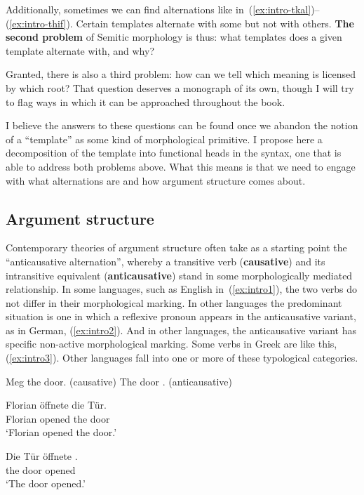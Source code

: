 \begin{exe}
\begin{xlist}
\begin{exe}
\begin{exe}
\begin{exe}
\begin{exe}
\begin{xlist}
Additionally, sometimes we can find alternations like in~(\ref{ex:intro-tkal})--(\ref{ex:intro-thif}). Certain templates alternate with some but not with others. \textbf{The second problem} of Semitic morphology is thus: what templates does a given template alternate with, and why?

Granted, there is also a third problem: how can we tell which meaning is licensed by which root? That question deserves a monograph of its own, though I will try to flag ways in which it can be approached throughout the book.

I believe the answers to these questions can be found once we abandon the notion of a ``template'' as some kind of morphological primitive. I propose here a decomposition of the template into functional heads in the syntax, one that is able to address both problems above. What this means is that we need to engage with what alternations are and how argument structure comes about.

	\subsection{Argument structure}
Contemporary theories of argument structure often take as a starting point the ``anticausative alternation'', whereby a transitive verb (\textbf{causative}) and its intransitive equivalent (\textbf{anticausative}) stand in some morphologically mediated relationship. In some languages, such as English in~(\ref{ex:intro1}), the two verbs do not differ in their morphological marking. In other languages the predominant situation is one in which a reflexive pronoun appears in the anticausative variant, as in German, (\ref{ex:intro2}). And in other languages, the anticausative variant has specific non-active morphological marking. Some verbs in Greek are like this, (\ref{ex:intro3}). Other languages fall into one or more of these typological categories.
 \begin{exe}
 \ex \label{ex:intro1} 
 \begin{xlist} 
 	\ex  Meg the door. \hfill (causative) 
  	\ex  The door .			\hfill (anticausative) 
 \z

 \ex \label{ex:intro2} 
 \begin{xlist} 
 	\ex   
 		\gll Florian \"offnete die T\"ur.\\
		 Florian opened the door\\ 
 		\glt `Florian opened the door.' 
	
 	\ex   
 		\gll Die T\"ur \"offnete .\\
		 the door opened \\ 
 		\glt `The door opened.' 
	

\end{xlist}
\end{xlist}
\end{exe}
\end{xlist}
\end{exe}
\end{exe}
\end{exe}
\end{exe}
\end{xlist}
\end{exe}
